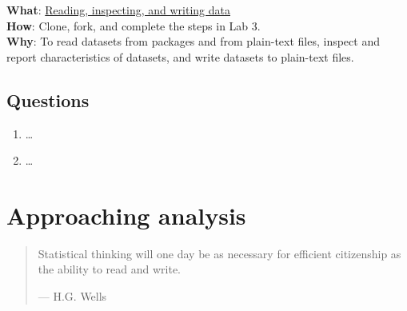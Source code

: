 \documentclass[
  letterpaper,
]{latex/krantz}
\providecommand{\tightlist}{%
  \setlength{\itemsep}{0pt}\setlength{\parskip}{0pt}}\usepackage{longtable,booktabs,array}
\begin{document}
\begin{tcolorbox}[enhanced jigsaw, toprule=.15mm, bottomtitle=1mm, coltitle=black, title=\textcolor{quarto-callout-tip-color}{\faLightbulb}\hspace{0.5em}{Lab}, left=2mm, colframe=quarto-callout-tip-color-frame, bottomrule=.15mm, colbacktitle=quarto-callout-tip-color!10!white, leftrule=.75mm, colback=white, titlerule=0mm, breakable, toptitle=1mm, opacityback=0, arc=.35mm, rightrule=.15mm, opacitybacktitle=0.6]

\textbf{What}: \href{https://github.com/lin380/lab_3}{Reading,
inspecting, and writing data}\\
\textbf{How}: Clone, fork, and complete the steps in Lab 3.\\
\textbf{Why}: To read datasets from packages and from plain-text files,
inspect and report characteristics of datasets, and write datasets to
plain-text files.

\end{tcolorbox}

\hypertarget{questions-1}{%
\section*{Questions}\label{questions-1}}


\begin{enumerate}
\def\labelenumi{\arabic{enumi}.}
\tightlist
\item
  \ldots{}
\item
  \ldots{}
\end{enumerate}

\hypertarget{sec-approaching-analysis}{%
\chapter{Approaching analysis}\label{sec-approaching-analysis}}

\begin{quote}
Statistical thinking will one day be as necessary for efficient
citizenship as the ability to read and write.

--- H.G. Wells
\end{quote}
\end{document}
